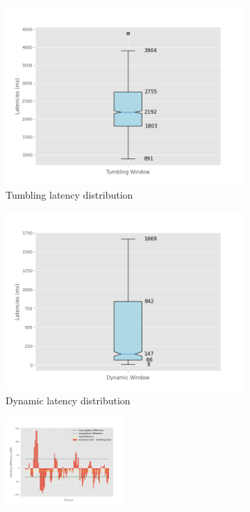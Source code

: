 \begin{figure}
\begin{subfigure}[b]{0.5\textwidth}
        \includegraphics[width=\textwidth]{fig/periodic/TumblingWindow_latency_boxplot.png}
        \caption{Tumbling latency distribution}
        \label{fig:periodic_tumb_boxplot}
    \end{subfigure}
    \hfill 
    \begin{subfigure}[b]{0.5\textwidth}
        \includegraphics[width=\textwidth]{fig/periodic/DynamicWindow_latency_boxplot.png}
        \caption{Dynamic latency distribution}
        \label{fig:periodic_dynamic_boxplot}
    \end{subfigure}
    \begin{subfigure}[b]{\textwidth}
        \centering
        \includegraphics[width=0.5\textwidth]{fig/periodic/mem_difference_bar.png}

\end{subfigure}
\end{figure}
